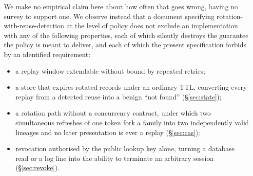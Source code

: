 \documentclass[11pt]{article}
\begin{document}
We make no empirical claim here about how often that goes wrong, having no
survey to support one. We observe instead that a document specifying
rotation-with-reuse-detection at the level of policy does not exclude an
implementation with any of the following properties, each of which silently
destroys the guarantee the policy is meant to deliver, and each of which the
present specification forbids by an identified requirement:

\begin{itemize}[leftmargin=1.4em, itemsep=2pt, topsep=3pt]
  \item a replay window extendable without bound by repeated retries;
  \item a store that expires rotated records under an ordinary TTL,
  converting every replay from a detected reuse into a benign
  ``not found'' (\S\ref{sec:state});
  \item a rotation path without a concurrency contract, under which two
  simultaneous refreshes of one token fork a family into two independently
  valid lineages and no later presentation is ever a replay
  (\S\ref{sec:cas});
  \item revocation authorised by the public lookup key alone, turning a
  database read or a log line into the ability to terminate an arbitrary
  session (\S\ref{sec:revoke}).
\end{itemize}
\end{document}
